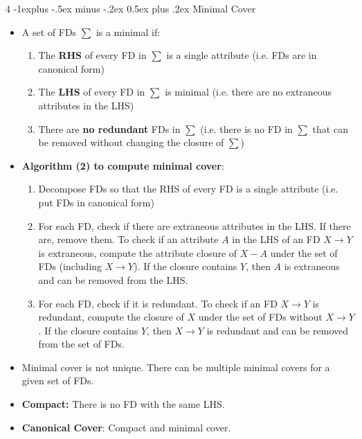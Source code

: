 \documentclass[10pt, landscape]{article}
\makeatletter
\renewcommand{\subsection}{\@startsection{subsection}{2}{0mm}%
  {-1explus -.5ex minus -.2ex}%
  {0.5ex plus .2ex}%
{\normalfont\normalsize\bfseries}}
\makeatother
\begin{document}
\begin{multicols*}{4}
  \subsection{Minimal Cover}
  \begin{itemize}
    \item A set of FDs $\sum$ is a minimal if:
    \begin{enumerate}
        \item The \textbf{RHS} of every FD in $\sum$ is a single attribute (i.e. FDs are in canonical form)
        \item The \textbf{LHS} of every FD in $\sum$ is minimal (i.e. there are no extraneous attributes in the LHS)
        \item There are \textbf{no redundant} FDs in $\sum$ (i.e. there is no FD in $\sum$ that can be removed without changing the closure of $\sum$)
    \end{enumerate}
    \item \textbf{Algorithm (2) to compute minimal cover}:
    \begin{enumerate}
        \item Decompose FDs so that the RHS of every FD is a single attribute (i.e. put FDs in canonical form)
        \item For each FD, check if there are extraneous attributes in the LHS. If there are, remove them. To check if an attribute $A$ in the LHS of an FD $X \rightarrow Y$ is extraneous, compute the attribute closure of $X - A$ under the set of FDs (including $X \rightarrow Y$). If the closure contains $Y$, then $A$ is extraneous and can be removed from the LHS.
        \item For each FD, check if it is redundant. To check if an FD $X \rightarrow Y$ is redundant, compute the closure of $X$ under the set of FDs without $X \rightarrow Y$. If the closure contains $Y$, then $X \rightarrow Y$ is redundant and can be removed from the set of FDs.
    \end{enumerate}
    \item Minimal cover is not unique. There can be multiple minimal covers for a given set of FDs.
    \item \textbf{Compact:} There is no FD with the same LHS.
    \item \textbf{Canonical Cover}: Compact and minimal cover. 
  \end{itemize}
  

\end{multicols*}
\end{document}
